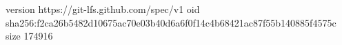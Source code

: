 version https://git-lfs.github.com/spec/v1
oid sha256:f2ca26b5482d10675ac70e03b40d6a6f0f14c4b68421ac87f55b140885f4575c
size 174916
